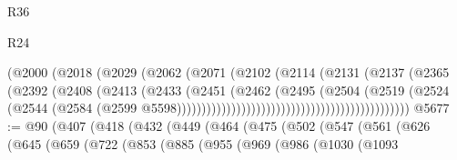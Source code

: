 \begin{lexlean}{R36}
\begin{lexlean}{R24}
\begin{coremodule}
{{{{{{{{{{{{{{{{{{{{{{{{{{{{{{{{{{{{{{{{{{{{{{{{{{{{{{{{{{{{{{{{{{{{{{{{{{{{{{{{{{{{{{{{{{{{{{{{{{{{{{{{{{{{{{{{{{{{{{{{{{{{{{{{{{{{{{{{{{{{{{{{{{{{{{{{{{{{{{{{{{{{{{{{{{{{{{{{{{{{{{{{{{{{{{{{{{{                                                    (@2000
                                                      (@2018
                                                        (@2029
                                                          (@2062
                                                            (@2071
                                                              (@2102
                                                                (@2114
                                                                  (@2131
                                                                    (@2137
                                                                      (@2365
                                                                        (@2392
                                                                          (@2408
                                                                            (@2413
                                                                              (@2433
                                                                                (@2451
                                                                                  (@2462
                                                                                    (@2495
                                                                                      (@2504
                                                                                        (@2519
                                                                                          (@2524
                                                                                            (@2544
                                                                                              (@2584
                                                                                                (@2599
                                                                                                  @5598)))))))))))))))))))))))))))))))))))))))))))))))
@5677 := @90
    (@407
      (@418
        (@432
          (@449
            (@464
              (@475
                (@502
                  (@547
                    (@561
                      (@626
                        (@645
                          (@659
                            (@722
                              (@853
                                (@885
                                  (@955
                                    (@969
                                      (@986
                                        (@1030
                                          (@1093
}}}}}}}}}}}}}}}}}}}}}}}}}}}}}}}}}}}}}}}}}}}}}}}}}}}}}}}}}}}}}}}}}}}}}}}}}}}}}}}}}}}}}}}}}}}}}}}}}}}}}}}}}}}}}}}}}}}}}}}}}}}}}}}}}}}}}}}}}}}}}}}}}}}}}}}}}}}}}}}}}}}}}}}}}}}}}}}}}}}}}}}}}}}}}}}}}}}
\end{coremodule}
\end{lexlean}
\end{lexlean}
